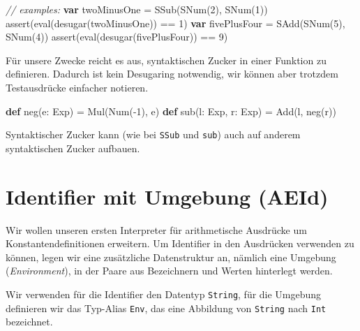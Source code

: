 \documentclass[]{article}
\newenvironment{Shaded}{}{}
\newcommand{\CommentTok}[1]{\textcolor[rgb]{0.38,0.63,0.69}{\textit{#1}}}
\newcommand{\DecValTok}[1]{\textcolor[rgb]{0.25,0.63,0.44}{#1}}
\newcommand{\FunctionTok}[1]{\textcolor[rgb]{0.02,0.16,0.49}{#1}}
\newcommand{\KeywordTok}[1]{\textcolor[rgb]{0.00,0.44,0.13}{\textbf{#1}}}
\newcommand{\NormalTok}[1]{#1}
\begin{document}
\begin{Shaded}
\begin{Highlighting}[]
\CommentTok{// examples:}
\KeywordTok{var}\NormalTok{ twoMinusOne = }\FunctionTok{SSub}\NormalTok{(}\FunctionTok{SNum}\NormalTok{(}\DecValTok{2}\NormalTok{), }\FunctionTok{SNum}\NormalTok{(}\DecValTok{1}\NormalTok{))}
\FunctionTok{assert}\NormalTok{(}\FunctionTok{eval}\NormalTok{(}\FunctionTok{desugar}\NormalTok{(twoMinusOne)) == }\DecValTok{1}\NormalTok{)}
\KeywordTok{var}\NormalTok{ fivePlusFour = }\FunctionTok{SAdd}\NormalTok{(}\FunctionTok{SNum}\NormalTok{(}\DecValTok{5}\NormalTok{), }\FunctionTok{SNum}\NormalTok{(}\DecValTok{4}\NormalTok{))}
\FunctionTok{assert}\NormalTok{(}\FunctionTok{eval}\NormalTok{(}\FunctionTok{desugar}\NormalTok{(fivePlusFour)) == }\DecValTok{9}\NormalTok{)}
\end{Highlighting}
\end{Shaded}

Für unsere Zwecke reicht es aus, syntaktischen Zucker in einer Funktion
zu definieren. Dadurch ist kein Desugaring notwendig, wir können aber
trotzdem Testausdrücke einfacher notieren.

\begin{Shaded}
\begin{Highlighting}[]
\KeywordTok{def} \FunctionTok{neg}\NormalTok{(e: Exp) = }\FunctionTok{Mul}\NormalTok{(}\FunctionTok{Num}\NormalTok{({-}}\DecValTok{1}\NormalTok{), e)}
\KeywordTok{def} \FunctionTok{sub}\NormalTok{(l: Exp, r: Exp) = }\FunctionTok{Add}\NormalTok{(l, }\FunctionTok{neg}\NormalTok{(r))}
\end{Highlighting}
\end{Shaded}

Syntaktischer Zucker kann (wie bei \texttt{SSub} und \texttt{sub}) auch
auf anderem syntaktischen Zucker aufbauen.

\hypertarget{identifier-mit-umgebung-aeid}{%
\section{Identifier mit Umgebung
(AEId)}\label{identifier-mit-umgebung-aeid}}

Wir wollen unseren ersten Interpreter für arithmetische Ausdrücke um Konstantendefinitionen
erweitern. Um Identifier in den Ausdrücken verwenden zu können, legen
wir eine zusätzliche Datenstruktur an, nämlich eine Umgebung
(\emph{Environment}), in der Paare aus Bezeichnern und Werten hinterlegt
werden.

Wir verwenden für die Identifier den Datentyp \texttt{String}, für die
Umgebung definieren wir das Typ-Alias \texttt{Env}, das eine Abbildung
von \texttt{String} nach \texttt{Int} bezeichnet.
\end{document}
